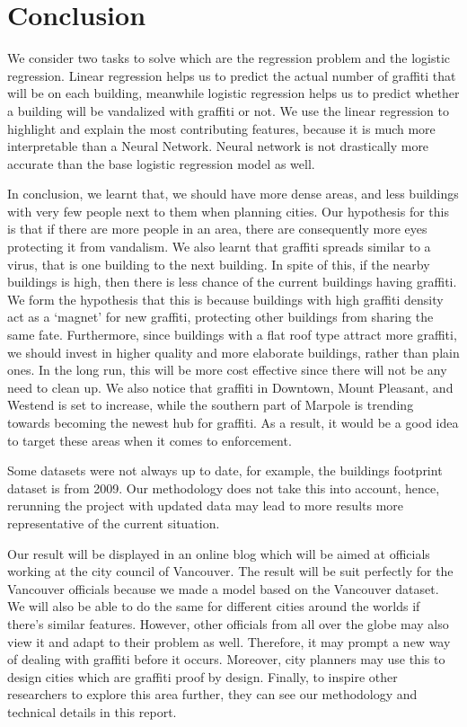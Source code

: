 \chapter{Conclusion}

We consider two tasks to solve which are the regression problem and the logistic regression. Linear regression helps us to predict the actual number of graffiti that will be on each building, meanwhile logistic regression helps us to predict whether a building will be vandalized with graffiti or not. We use the linear regression to highlight and explain the most contributing features, because it is much more interpretable than a Neural Network. Neural network is not drastically more accurate than the base logistic regression model as well.

In conclusion, we learnt that, we should have more dense areas, and less buildings with very few people next to them when planning cities. Our hypothesis for this is that if there are more people in an area, there are consequently more eyes protecting it from vandalism. We also learnt that graffiti spreads similar to a virus, that is one building to the next building. In spite of this, if the nearby buildings is high, then there is less chance of the current buildings having graffiti. We form the hypothesis that this is because buildings with high graffiti density act as a ‘magnet’ for new graffiti, protecting other buildings from sharing the same fate. Furthermore, since buildings with a flat roof type attract more graffiti, we should invest in higher quality and more elaborate buildings, rather than plain ones. In the long run, this will be more cost effective since there will not be any need to clean up. We also notice that graffiti in Downtown, Mount Pleasant, and Westend is set to increase, while the southern part of Marpole is trending towards becoming  the newest hub for graffiti. As a result, it would be a good idea to target these areas when it comes to enforcement.

Some datasets were not always up to date, for example, the buildings footprint dataset is from 2009. Our methodology does not take this into account, hence, rerunning the project with updated data may lead to more results more representative of the current situation.

Our result will be displayed in an online blog which will be aimed at officials working at the city council of Vancouver. The result will be suit perfectly for the Vancouver officials because we made a model based on the Vancouver dataset. We will also be able to do the same for different cities around the worlds if there’s similar features. However, other officials from all over the globe may also view it and adapt to their problem as well. Therefore, it may prompt a new way of dealing with graffiti before it occurs. Moreover, city planners may use this to design cities which are graffiti proof by design. Finally, to inspire other researchers to explore this area further, they can see our methodology and technical details in this report.